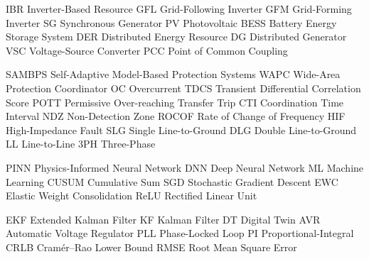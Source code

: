 
   {IBR}   {Inverter-Based Resource}
   {GFL}   {Grid-Following Inverter}
   {GFM}   {Grid-Forming Inverter}
    {SG}    {Synchronous Generator}
    {PV}    {Photovoltaic}
  {BESS}  {Battery Energy Storage System}
   {DER}   {Distributed Energy Resource}
    {DG}    {Distributed Generator}
   {VSC}   {Voltage-Source Converter}
   {PCC}   {Point of Common Coupling}

 {SAMBPS} {Self-Adaptive Model-Based Protection Systems}
  {WAPC}  {Wide-Area Protection Coordinator}
    {OC}    {Overcurrent}
  {TDCS}  {Transient Differential Correlation Score}
  {POTT}  {Permissive Over-reaching Transfer Trip}
   {CTI}   {Coordination Time Interval}
   {NDZ}   {Non-Detection Zone}
 {ROCOF} {Rate of Change of Frequency}
   {HIF}   {High-Impedance Fault}
   {SLG}   {Single Line-to-Ground}
   {DLG}   {Double Line-to-Ground}
    {LL}    {Line-to-Line}
   {3PH}   {Three-Phase}

  {PINN}  {Physics-Informed Neural Network}
   {DNN}   {Deep Neural Network}
    {ML}    {Machine Learning}
 {CUSUM} {Cumulative Sum}
   {SGD}   {Stochastic Gradient Descent}
   {EWC}   {Elastic Weight Consolidation}
  {ReLU}  {Rectified Linear Unit}

   {EKF}   {Extended Kalman Filter}
    {KF}    {Kalman Filter}
    {DT}    {Digital Twin}
   {AVR}   {Automatic Voltage Regulator}
   {PLL}   {Phase-Locked Loop}
    {PI}    {Proportional-Integral}
  {CRLB}  {Cram\'{e}r--Rao Lower Bound}
  {RMSE}  {Root Mean Square Error}

